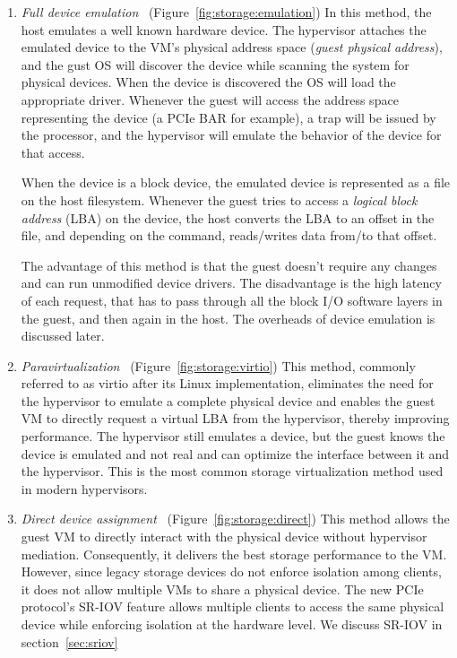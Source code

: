 \begin{enumerate}
\item
  \emph{Full device emulation}~\cite{sugerman2001virtualizing} (Figure~\ref{fig:storage:emulation})\quad
  In this method, the host emulates a well known hardware device.
  The hypervisor attaches the emulated device to the VM's physical address space (\emph{guest physical address}), and the gust OS will discover the device while scanning the system for physical devices. When the device is discovered
  the OS will load the appropriate driver. Whenever the guest will access the address space representing the device (a PCIe BAR for example), a trap will be issued by the processor, and the hypervisor will emulate the
  behavior of the device for that access.

  When the device is a block device, the emulated device is represented as a file on the host filesystem. Whenever the guest tries to access a \emph{logical block address} (LBA) on the device, the host converts the LBA to an offset
  in the file, and depending on the command, reads/writes data from/to that offset.

  The advantage of this method is that the guest doesn't require any changes and can run unmodified device drivers.
  The disadvantage is the high latency of each request, that has to pass through all the block I/O software layers in the guest, and then again in the host. 
  The overheads of device emulation is discussed later.

  
\item
  \emph{Paravirtualization}~\cite{barham2003xen,russell2008virtio} (Figure~\ref{fig:storage:virtio})\quad
  This method, commonly referred to as virtio after its Linux implementation, eliminates the need for the hypervisor to emulate a complete physical device and enables the guest VM to directly request a virtual LBA from the
  hypervisor, thereby improving performance. The hypervisor still emulates a device, but the guest knows the device is emulated and not real and can optimize the interface between it and the hypervisor. 
  This is the most common storage virtualization method used in modern hypervisors.

\item
  \emph{Direct device assignment}~\cite{raj2007high} (Figure~\ref{fig:storage:direct})\quad
  This method allows the guest VM to directly interact with the physical device without hypervisor mediation. 
  Consequently, it delivers the best storage performance to the VM. However, since legacy storage devices do not enforce isolation among clients, it does not allow multiple VMs to share a physical device. The new PCIe protocol's SR-IOV feature
  allows multiple clients to access the same physical device while enforcing isolation at the hardware level. We discuss SR-IOV in section~\ref{sec:sriov}
  

\end{enumerate}


